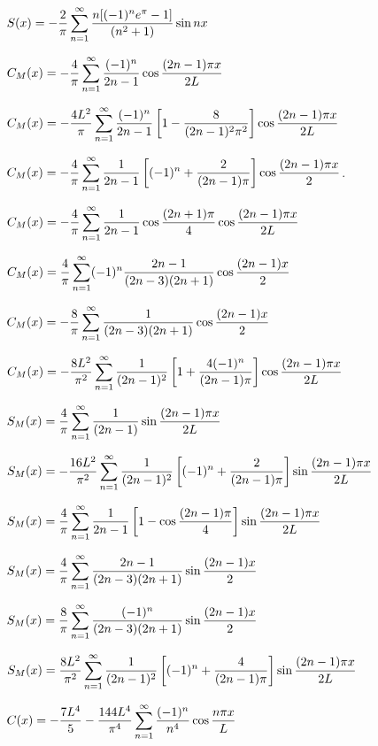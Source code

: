 $S(x)=\displaystyle-\frac{2}{\pi}\sum_{n=1}^{\infty}
\frac{n[(-1)^{n}e^{\pi}-1]}{(n^{2}+1)}\sin nx$

$C_{M}(x)=\displaystyle-\frac{4}{\pi}\sum_{n=1}^{\infty}\frac{(-1)^{n}}{2n-1}
\cos\frac{(2n-1)\pi x}{2L}$

$C_{M}(x)=\displaystyle-\frac{4L^{2}}{\pi}\sum_{n=1}^{\infty}\frac{(-1)^{n}}{2n-1}\left[
1-\frac{8}{(2n-1)^{2}\pi^{2}}\right]\cos\frac{(2n-1)\pi x}{2L}$

$C_{M}(x)=
-\displaystyle\frac{4}{\pi}\sum_{n=1}^{\infty}\frac{1}{2n-1}\left[(-1)^{n}+\frac{2}{(2n-1)\pi}\right]
\cos\frac{(2n-1)\pi x}{2}$.

$C_{M}(x)=\displaystyle-\frac{4}{\pi}\sum_{n=1}^{\infty}\frac{1}{2n-1}\cos\frac{(2n+1)\pi}{4}
\cos\frac{(2n-1)\pi x}{2L}$

 $C_{M}(x)=
\displaystyle\frac{4}{\pi}\sum_{n=1}^{\infty}(-1)^{n}\frac{2n-1}{(2n-3)(2n+1)}
\cos\frac{(2n-1)x}{2}$

$C_{M}(x)=
-\displaystyle\frac{8}{\pi}\sum_{n=1}^{\infty}\frac{1}{(2n-3)(2n+1)}
\cos\frac{(2n-1)x}{2}$

$C_{M}(x)=-\displaystyle\frac{8L^{2}}{\pi^{2}}\sum_{n=1}^{\infty}\frac{1}{(2n-1)^{2}}\left[
1+\frac{4(-1)^{n}}{(2n-1)\pi}\right]\cos\frac{(2n-1)\pi
x}{2L}$

$S_{M}(x)=\displaystyle\frac{4}{\pi}\sum_{n=1}^{\infty}\frac{1}{(2n-1)}
\sin\frac{(2n-1)\pi x}{2L}$

$S_{M}(x)=\displaystyle-\frac{16L^{2}}{\pi^{2}}\sum_{n=1}^{\infty}\frac{1}{(2n-1)^{2}}\left[
(-1)^{n}+\frac{2}{(2n-1)\pi}\right]\sin\frac{(2n-1)\pi x}{2L}$

$S_{M}(x)=\displaystyle\frac{4}{\pi}\sum_{n=1}^{\infty}\frac{1}{2n-1}
\left[1-\cos\frac{(2n-1)\pi}{4}\right]
\sin\frac{(2n-1)\pi x}{2L}$

$S_{M}(x)=\displaystyle\frac{4}{\pi}\sum_{n=1}^{\infty}\frac{2n-1}{(2n-3)(2n+1)}\sin\frac{(2n-1)
x}{2}$

$S_{M}(x)=\displaystyle\frac{8}{\pi}\sum_{n=1}^{\infty}\frac{(-1)^{n}}{(2n-3)(2n+1)}\sin\frac{(2n-1)
x}{2}$

$S_{M}(x)=\displaystyle\frac{8L^{2}}{\pi^{2}}\sum_{n=1}^{\infty}\frac{1}{(2n-1)^{2}}\left[
(-1)^{n}+\frac{4}{(2n-1)\pi}\right]\sin\frac{(2n-1)\pi
x}{2L}$

$C(x)=\displaystyle-\frac{7L^{4}}{5}-\frac{144L^{4}}{\pi^{4}}\sum_{n=1}^{\infty}\frac{(-1)^{n}}{n^{4}}\cos\frac{n\pi x}{L}$

